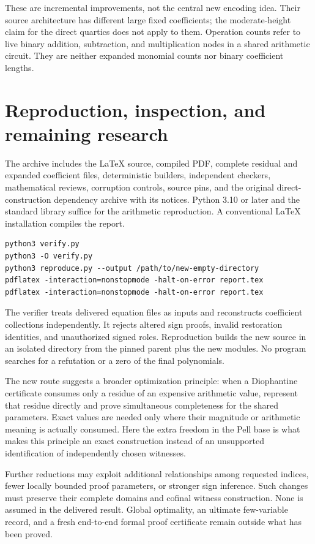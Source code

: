 \documentclass[10pt,letterpaper]{article}
\theoremstyle{remark}\newtheorem{remark}[theorem]{Remark}
\begin{document}
These are incremental improvements, not the central new encoding idea.
Their source architecture has different large fixed coefficients; the
moderate-height claim for the direct quartics does not apply to them.
Operation counts refer to live binary addition, subtraction, and
multiplication nodes in a shared arithmetic circuit. They are neither
expanded monomial counts nor binary coefficient lengths.

\section{Reproduction, inspection, and remaining research}

The archive includes the LaTeX source, compiled PDF, complete residual
and expanded coefficient files, deterministic builders, independent
checkers, mathematical reviews, corruption controls, source pins, and
the original direct-construction dependency archive with its notices.
Python 3.10 or later and the standard library suffice for the arithmetic
reproduction. A conventional LaTeX installation compiles the report.

\begin{verbatim}
python3 verify.py
python3 -O verify.py
python3 reproduce.py --output /path/to/new-empty-directory
pdflatex -interaction=nonstopmode -halt-on-error report.tex
pdflatex -interaction=nonstopmode -halt-on-error report.tex
\end{verbatim}

The verifier treats delivered equation files as inputs and reconstructs
coefficient collections independently. It rejects altered sign proofs,
invalid restoration identities, and unauthorized signed roles.
Reproduction builds the new source in an isolated directory from the
pinned parent plus the new modules. No program searches for a refutation
or a zero of the final polynomials.

The new route suggests a broader optimization principle: when a
Diophantine certificate consumes only a residue of an expensive
arithmetic value, represent that residue directly and prove simultaneous
completeness for the shared parameters. Exact values are needed only
where their magnitude or arithmetic meaning is actually consumed.
Here the extra freedom in the Pell base is what makes this principle
an exact construction instead of an unsupported identification of
independently chosen witnesses.

Further reductions may exploit additional relationships among requested
indices, fewer locally bounded proof parameters, or stronger sign
inference. Such changes must preserve their complete domains and
cofinal witness construction. None is assumed in the delivered result.
Global optimality, an ultimate few-variable record, and a fresh
end-to-end formal proof certificate remain outside what has been proved.
\end{document}
